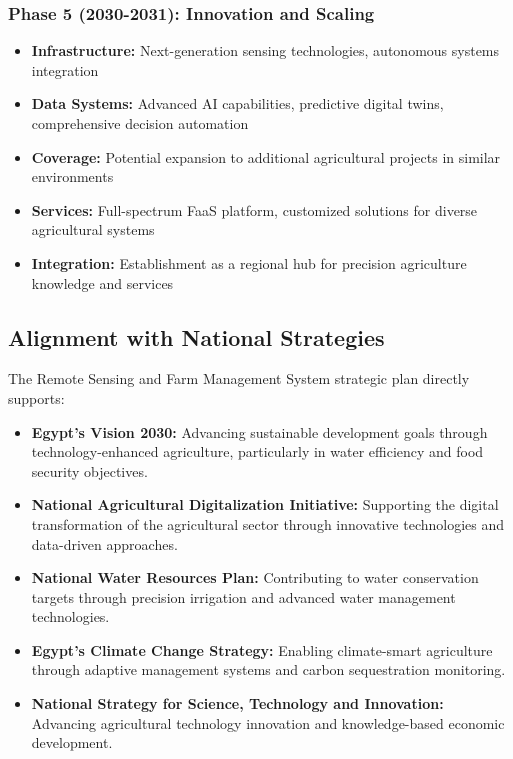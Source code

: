 \subsubsection{Phase 5 (2030-2031): Innovation and Scaling}
\begin{itemize}
    \item \textbf{Infrastructure:} Next-generation sensing technologies, autonomous systems integration
    \item \textbf{Data Systems:} Advanced AI capabilities, predictive digital twins, comprehensive decision automation
    \item \textbf{Coverage:} Potential expansion to additional agricultural projects in similar environments
    \item \textbf{Services:} Full-spectrum FaaS platform, customized solutions for diverse agricultural systems
    \item \textbf{Integration:} Establishment as a regional hub for precision agriculture knowledge and services
\end{itemize}

\subsection{Alignment with National Strategies}

The Remote Sensing and Farm Management System strategic plan directly supports:

\begin{itemize}
    \item \textbf{Egypt's Vision 2030:} Advancing sustainable development goals through technology-enhanced agriculture, particularly in water efficiency and food security objectives.
    
    \item \textbf{National Agricultural Digitalization Initiative:} Supporting the digital transformation of the agricultural sector through innovative technologies and data-driven approaches.
    
    \item \textbf{National Water Resources Plan:} Contributing to water conservation targets through precision irrigation and advanced water management technologies.
    
    \item \textbf{Egypt's Climate Change Strategy:} Enabling climate-smart agriculture through adaptive management systems and carbon sequestration monitoring.
    
    \item \textbf{National Strategy for Science, Technology and Innovation:} Advancing agricultural technology innovation and knowledge-based economic development.
\end{itemize}

